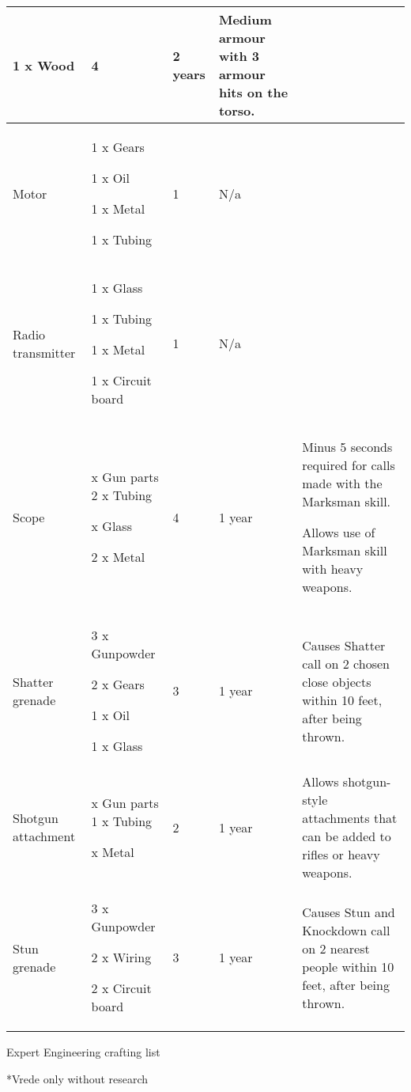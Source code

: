 \documentclass{scrbook}
\begin{document}
\begin{table}
\begin{tabular}{|l|l|l|l|l|}
1 x Wood & 4 & 2 years & Medium armour with 3 armour hits on the torso. \\
 \hline Motor & 1 x Gears\par 1 x Oil\par 1 x Metal\par 1 x Tubing & 1 & N/a &  \\
 \hline Radio transmitter & 1 x Glass\par 1 x Tubing\par 1 x Metal\par 1 x Circuit board & 1 & N/a &  \\
 \hline Scope &

x Gun parts 2 x Tubing

x Glass

2 x Metal & 4 & 1 year & Minus 5 seconds required for calls made with the Marksman skill.\par Allows use of Marksman skill with heavy weapons. \\
 \hline Shatter grenade & 3 x Gunpowder\par 2 x Gears\par 1 x Oil\par 1 x Glass & 3 & 1 year & Causes Shatter call on 2 chosen close objects within 10 feet, after being thrown. \\
 \hline Shotgun attachment &

x Gun parts 1 x Tubing

x Metal

 & 2 & 1 year & Allows shotgun-style attachments that can be added to rifles or heavy weapons. \\
 \hline Stun grenade & 3 x Gunpowder\par 2 x Wiring\par 2 x Circuit board & 3 & 1 year & Causes Stun and Knockdown call on 2 nearest people within 10 feet, after being thrown. \\
 \hline \end{tabular}

\end{table}

Expert Engineering crafting list

*Vrede only without research
\end{document}
